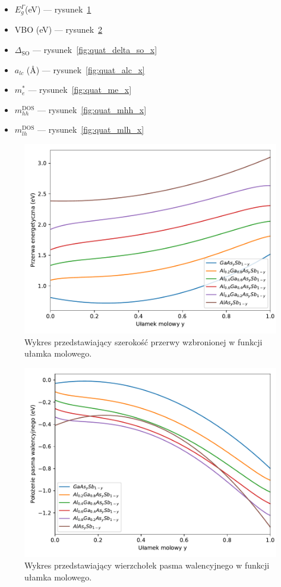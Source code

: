 \documentclass[12pt,openany,a4paper]{book}
\begin{document}
\begin{itemize}
	\item \(E_g^{\Gamma}\)(eV) --- rysunek~\ref{fig:quat_Eg_x}
	\item VBO (eV) --- rysunek~\ref{fig:quat_vbo_x} 
	\item \(\Delta_{\textrm{SO}}\) --- rysunek~\ref{fig:quat_delta_so_x}
	\item \(a_{lc}\) (\AA) --- rysunek~\ref{fig:quat_alc_x}
	\item \(m_e^{\ast}\) --- rysunek~\ref{fig:quat_me_x}
	\item \(m_{hh}^{\textrm{DOS}}\) --- rysunek~\ref{fig:quat_mhh_x}
	\item \(m_{lh}^{\textrm{DOS}}\) --- rysunek~\ref{fig:quat_mlh_x}
\end{itemize}

\begin{figure}[H]
	\centering
	\includegraphics[width = 0.9\linewidth]{Figures/quaternary/quat_eg_x.pdf}
	\caption{Wykres przedstawiający szerokość przerwy wzbronionej w funkcji ułamka 
	molowego.}\label{fig:quat_Eg_x}
\end{figure}

\begin{figure}[H]
	\centering
	\includegraphics[width = 0.9\linewidth]{Figures/quaternary/quat_vbo_x.pdf}
	\caption{Wykres przedstawiający wierzchołek pasma walencyjnego w funkcji ułamka 
	molowego.}\label{fig:quat_vbo_x}
\end{figure}
\end{document}
